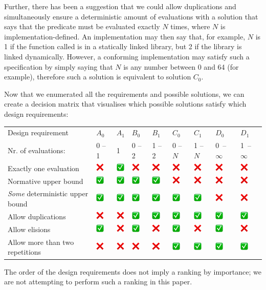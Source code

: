 Further, there has been a suggestion that we could allow duplications and simultaneously ensure a deterministic amount of evaluations with a solution that says that the predicate must be evaluated exactly $N$ times, where $N$ is implementation-defined. An implementation may then say that, for example, $N$ is 1 if the function called is in a statically linked library, but 2 if the library is linked dynamically. However, a conforming implementation may satisfy such a specification by simply saying that $N$ is any number between 0 and 64 (for example), therefore such a solution is equivalent to solution $C_0$.

Now that we enumerated all the requirements and possible solutions, we can create a decision matrix that visualises which possible solutions satisfy which design requirements:

\newcommand{\yes}{\includegraphics[width=4mm]{images/yes.png}}
\newcommand{\no}{\includegraphics[width=4mm]{images/no.png}}
\begin{table}[!htbp]
\begin{tabular}{|p{5.4cm}|p{0.9cm}|p{0.9cm}|p{0.9cm}|p{0.9cm}|p{0.9cm}|p{0.9cm}|p{0.9cm}|p{0.9cm}|}
\hline 
Design requirement & $A_0$ & $A_1$ & $B_0$ & $B_1$ & $C_0$ & $C_1$ & $D_0$ & $D_1$ \\
\phantom{xxxxxxxxxxxi}Nr. of evaluations:& 0 -- 1 & 1 & 0 -- 2& 1 -- 2 & 0 -- $N$ & 1 -- $N$ & \mbox{0 -- $\infty$} & \mbox{1 -- $\infty$} \\
\hline
Exactly one evaluation& \no & \yes & \no & \no & \no & \no & \no & \no \\
\hline
Normative upper bound & \yes & \yes & \yes & \yes & \no & \no & \no & \no \\
\hline
\emph{Some} deterministic upper bound & \yes & \yes & \yes & \yes & \yes & \yes & \no & \no \\
\hline
Allow duplications & \no & \no & \yes & \yes  & \yes & \yes & \yes & \yes \\
\hline
Allow elisions & \yes & \no & \yes & \no & \yes & \no & \yes & \no \\
\hline
Allow more than two repetitions& \no & \no & \no & \no & \yes & \yes & \yes & \yes \\
\hline
\end{tabular}
\end{table}
The order of the design requirements does not imply a ranking by importance; we are not attempting to perform such a ranking in this paper.


